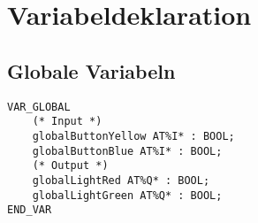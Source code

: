 


\section{Variabeldeklaration}

\subsection{Globale Variabeln}
\begin{lstlisting}
VAR_GLOBAL
    (* Input *)
    globalButtonYellow AT%I* : BOOL;
    globalButtonBlue AT%I* : BOOL;
    (* Output *)
    globalLightRed AT%Q* : BOOL;
    globalLightGreen AT%Q* : BOOL;
END_VAR
\end{lstlisting}
